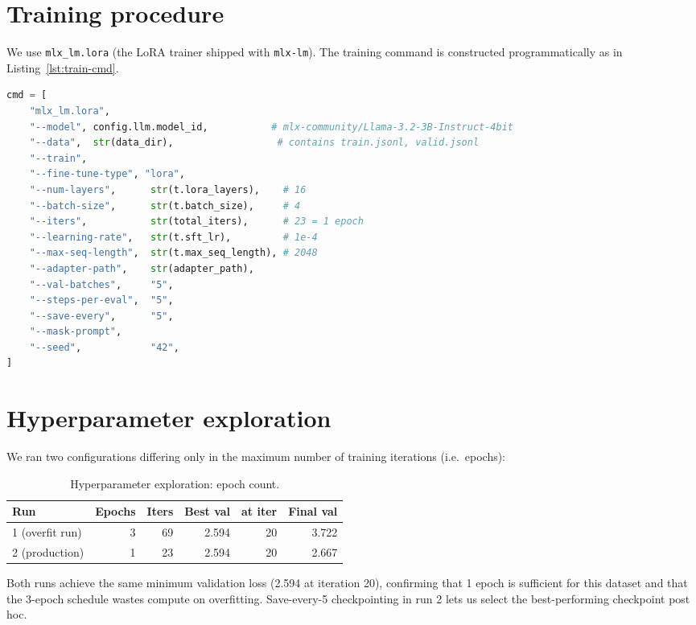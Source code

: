 \documentclass{ecsproject}
\begin{document}
\section{Training procedure}
We use \texttt{mlx\_lm.lora} (the LoRA trainer shipped with
\texttt{mlx-lm}). The training command is constructed
programmatically as in Listing~\ref{lst:train-cmd}.

\begin{lstlisting}[language=Python, caption={Training command builder (excerpt from \texttt{src/marcus/training/sft.py}).}, label={lst:train-cmd}]
cmd = [
    "mlx_lm.lora",
    "--model", config.llm.model_id,           # mlx-community/Llama-3.2-3B-Instruct-4bit
    "--data",  str(data_dir),                  # contains train.jsonl, valid.jsonl
    "--train",
    "--fine-tune-type", "lora",
    "--num-layers",      str(t.lora_layers),    # 16
    "--batch-size",      str(t.batch_size),     # 4
    "--iters",           str(total_iters),      # 23 = 1 epoch
    "--learning-rate",   str(t.sft_lr),         # 1e-4
    "--max-seq-length",  str(t.max_seq_length), # 2048
    "--adapter-path",    str(adapter_path),
    "--val-batches",     "5",
    "--steps-per-eval",  "5",
    "--save-every",      "5",
    "--mask-prompt",
    "--seed",            "42",
]
\end{lstlisting}

\section{Hyperparameter exploration}
We ran two configurations differing only in the maximum number of
training iterations (i.e.\ epochs):

\begin{table}[h]
\centering
\caption{Hyperparameter exploration: epoch count.}
\label{tab:hp-search}
\small
\begin{tabular}{@{}lrrrrr@{}}
\toprule
Run & Epochs & Iters & Best val & at iter & Final val \\
\midrule
1 (overfit run) & 3 & 69 & 2.594 & 20 & 3.722 \\
2 (production)  & 1 & 23 & 2.594 & 20 & 2.667 \\
\bottomrule
\end{tabular}
\end{table}

Both runs achieve the same minimum validation loss (2.594 at iteration
20), confirming that 1 epoch is sufficient for this dataset and that
the 3-epoch schedule wastes compute on overfitting. Save-every-5
checkpointing in run 2 lets us select the best-performing checkpoint
post hoc.
\end{document}
